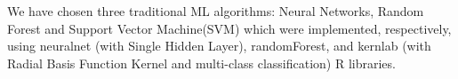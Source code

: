 We have chosen three traditional ML algorithms: Neural Networks\cite{Haykin:1998}, Random Forest\cite{Breiman2001} and Support Vector Machine(SVM)\cite{Cristianini:1999} which were implemented, respectively, using neuralnet (with Single Hidden Layer), randomForest, and kernlab (with Radial Basis Function Kernel and multi-class classification) R libraries.



